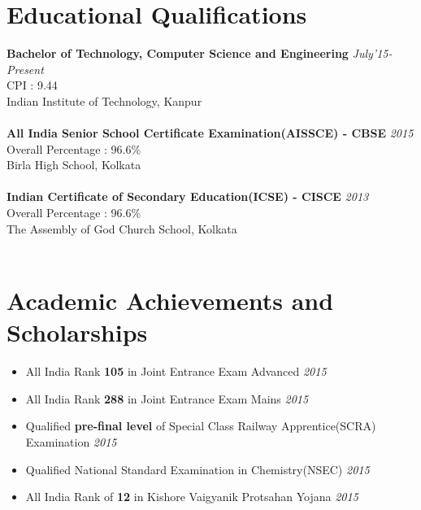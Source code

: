 \documentclass[11pt,a4paper]{moderncv}
\newcommand{\education}[5]{
  \textbf{\large{#1}} \hfill\textit{#2}\\
  #3 : #4\\
  #5\\
  \\
}
\newcommand{\achievement}[2]{
  \item #1 \hfill \textit{#2}\vspace{2mm}
}
\begin{document}
  \maketitle
  \section{Educational Qualifications}
    \education{Bachelor of Technology, Computer Science and Engineering}{July'15-Present}{CPI}{9.44}{Indian Institute of Technology, Kanpur}
    \education{All India Senior School Certificate Examination(AISSCE) - CBSE}{2015}{Overall Percentage}{96.6\%}{Birla High School, Kolkata}
    \education{Indian Certificate of Secondary Education(ICSE) - CISCE}{2013}{Overall Percentage}{96.6\%}{The Assembly of God Church School, Kolkata}
  \section{Academic Achievements and Scholarships}
    \begin{itemize}
      \achievement{All India Rank \textbf{105} in Joint Entrance Exam Advanced}{2015}
      \achievement{All India Rank \textbf{288} in Joint Entrance Exam Mains}{2015}
      \achievement{Qualified \textbf{pre-final level} of Special Class Railway Apprentice(SCRA) Examination}{2015}
      \achievement{Qualified National Standard Examination in Chemistry(NSEC)}{2015}
      \achievement{All India Rank of \textbf{12} in Kishore Vaigyanik Protsahan Yojana}{2015}
    \end{itemize}
\end{document}
